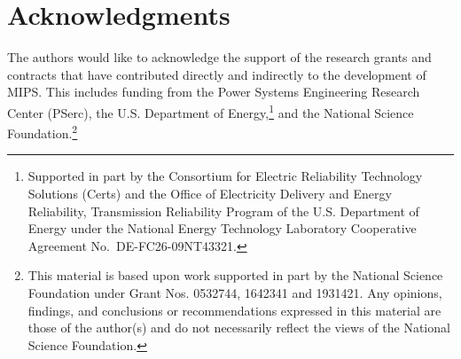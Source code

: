 \documentclass[12pt]{article}
\newcommand{\mips}[0]{{MIPS}}
\newcommand{\pserc}[0]{{\sc PSerc}}
\newcommand{\PSERC}[0]{{Power Systems Engineering Research Center (\pserc{})}}
\newcommand{\certs}[0]{{\sc Certs}}
\newcommand{\CERTS}[0]{{Consortium for Electric Reliability Technology Solutions (\certs{})}}
\numberwithin{equation}{section}
\numberwithin{table}{section}
\numberwithin{figure}{section}
\begin{document}
\clearpage
\section{Acknowledgments}
The authors would like to acknowledge the support of the research grants and contracts that have contributed directly and indirectly to the development of \mips{}. This includes funding from the \PSERC{}, the U.S. Department of Energy,\footnote{Supported in part by the \CERTS{} and the Office of Electricity Delivery and Energy Reliability, Transmission Reliability Program of the U.S. Department of Energy under the National Energy Technology Laboratory Cooperative Agreement No.~DE-FC26-09NT43321.} and the National Science Foundation.\footnote{This material is based upon work supported in part by the National Science Foundation under Grant Nos. 0532744, 1642341 and 1931421. Any opinions, findings, and conclusions or recommendations expressed in this material are those of the author(s) and do not necessarily reflect the views of the National Science Foundation.}
\end{document}

